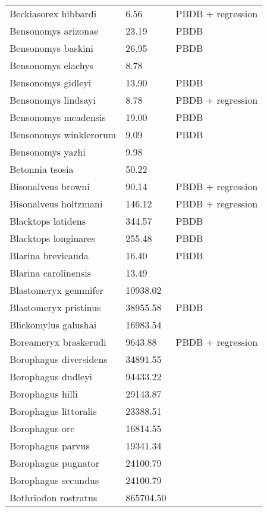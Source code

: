 \documentclass{article}
\begin{document}
\begin{center}
\begin{longtable}{p{} p{} p{} }
  Beckiasorex hibbardi & 6.56 & PBDB + regression \\ 
  Bensonomys arizonae & 23.19 & PBDB \\ 
  Bensonomys baskini & 26.95 & PBDB \\ 
  Bensonomys elachys & 8.78 & \cite{Kirk2011} \\ 
  Bensonomys gidleyi & 13.90 & PBDB \\ 
  Bensonomys lindsayi & 8.78 & PBDB + regression \\ 
  Bensonomys meadensis & 19.00 & PBDB \\ 
  Bensonomys winklerorum & 9.09 & PBDB \\ 
  Bensonomys yazhi & 9.98 & \cite{Rose2013a} \\ 
  Betonnia tsosia & 50.22 & \cite{Clemens2005} \\ 
  Bisonalveus browni & 90.14 & PBDB + regression \\ 
  Bisonalveus holtzmani & 146.12 & PBDB + regression \\ 
  Blacktops latidens & 344.57 & PBDB \\ 
  Blacktops longinares & 255.48 & PBDB \\ 
  Blarina brevicauda & 16.40 & PBDB \\ 
  Blarina carolinensis & 13.49 & \cite{Smith2004} \\ 
  Blastomeryx gemmifer & 10938.02 & \cite{Tomiya2013} \\ 
  Blastomeryx pristinus & 38955.58 & PBDB \\ 
  Blickomylus galushai & 16983.54 & \cite{Tomiya2013} \\ 
  Boreameryx braskerudi & 9643.88 & PBDB + regression \\ 
  Borophagus diversidens & 34891.55 & \cite{Tomiya2013} \\ 
  Borophagus dudleyi & 94433.22 & \cite{Dalquest1978} \\ 
  Borophagus hilli & 29143.87 & \cite{Tomiya2013} \\ 
  Borophagus littoralis & 23388.51 & \cite{Tomiya2013} \\ 
  Borophagus orc & 16814.55 & \cite{Tomiya2013} \\ 
  Borophagus parvus & 19341.34 & \cite{Tomiya2013} \\ 
  Borophagus pugnator & 24100.79 & \cite{Tomiya2013} \\ 
  Borophagus secundus & 24100.79 & \cite{Tomiya2013} \\ 
  Bothriodon rostratus & 865704.50 & \cite{Cassiliano2008} \\ 

\end{longtable}
\end{center}
\end{document}
